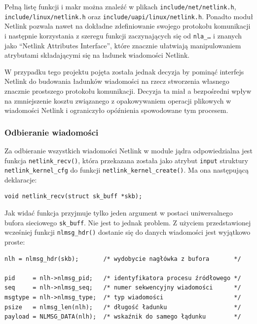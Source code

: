 \documentclass[11pt]{scrartcl}
\begin{document}
Pełną listę funkcji i makr można znaleźć w plikach \texttt{include/net/netlink.h}, \newline\texttt{include/linux/netlink.h} oraz \texttt{include/uapi/linux/netlink.h}. Ponadto moduł Netlink pozwala nawet na dokładne zdefiniowanie swojego protokołu komunikacji i następnie korzystania z szeregu funkcji zaczynających się od \texttt{nla\_\ldots} i znanych jako ``Netlink Attributes Interface'', które znacznie ułatwiają manipulowaniem atrybutami składającymi się na ładunek wiadomości Netlink.

W przypadku tego projektu pojęta została jednak decyzja by pominąć interfejs Netlink do budowania ładunków wiadomości na rzecz stworzenia własnego znacznie prostszego protokołu komunikacji. Decyzja ta miał a bezpośredni wpływ na zmniejszenie kosztu związanego z opakowywaniem operacji plikowych w wiadomości Netlink i ograniczyło opóźnienia spowodowane tym procesem.

\subsubsection{Odbieranie wiadomości}
\label{msgrecv}

Za odbieranie wszystkich wiadomości Netlink w module jądra odpowiedzialna jest funkcja \texttt{netlink\_recv()}, która przekazana została jako atrybut \texttt{input} struktury \newline\texttt{netlink\_kernel\_cfg} do funkcji \texttt{netlink\_kernel\_create()}. Ma ona następującą deklaracje:

\begin{verbatim}
void netlink_recv(struct sk_buff *skb);
\end{verbatim}

Jak widać funkcja przyjmuje tylko jeden argument w postaci uniwersalnego bufora sieciowego \texttt{sk\_buff}. Nie jest to jednak problem. Z użyciem przedstawionej wcześniej funkcji \texttt{nlmsg\_hdr()} dostanie się do danych wiadomości jest wyjątkowo proste:

\begin{verbatim}
nlh = nlmsg_hdr(skb);       /* wydobycie nagłówka z bufora       */

pid     = nlh->nlmsg_pid;   /* identyfikatora procesu źródłowego */
seq     = nlh->nlmsg_seq;   /* numer sekwencyjny wiadomości      */
msgtype = nlh->nlmsg_type;  /* typ wiadomości                    */
psize   = nlmsg_len(nlh);   /* długość ładunku                   */
payload = NLMSG_DATA(nlh);  /* wskaźnik do samego łądunku        */
\end{verbatim}
\end{document}

